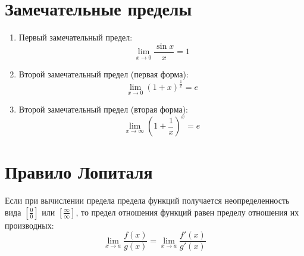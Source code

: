 \documentclass[12pt]{article}
\begin{document}
\section*{Замечательные пределы}

\begin{enumerate}
    \item Первый замечательный предел:
    \[
    \lim_{x \to 0} \frac{\sin x}{x} = 1
    \]
    
    \item Второй замечательный предел (первая форма):
    \[
    \lim_{x \to 0} (1 + x)^{\frac{1}{x}} = e
    \]
    
    \item Второй замечательный предел (вторая форма):
    \[
    \lim_{x \to \infty} \left(1 + \frac{1}{x}\right)^x = e
    \]
\end{enumerate}

\section*{Правило Лопиталя}

Если при вычислении предела предела функций получается неопределенность вида $\left[\frac{0}{0}\right]$ или $\left[\frac{\infty}{\infty}\right]$, то предел отношения функций равен пределу отношения их производных:
\[
\lim_{x \to a} \frac{f(x)}{g(x)} = \lim_{x \to a} \frac{f'(x)}{g'(x)}
\]
\end{document}
